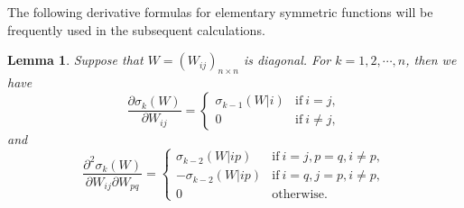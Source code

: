 \documentclass[11pt]{amsart}
\newtheorem{lemma}[theorem]{Lemma}
\numberwithin{theorem}{section}
\numberwithin{equation}{section}
\begin{document}
The following derivative formulas for elementary symmetric functions will be frequently used in the subsequent calculations.
\begin{lemma}\label{Lemma-sigma_k}
Suppose that $W=(W_{ij})_{n\times n}$ is diagonal. For $k=1,2,\cdots,n$, then we have $$\frac{\partial\sigma_k(W)}{\partial W_{ij}}=\begin{cases}
\sigma_{k-1}(W|i) & \mathrm{if}\ i=j,\\
0 & \mathrm{if}\ i\neq j,
\end{cases}$$ and $$\frac{\partial^2\sigma_k(W)}{\partial W_{ij}\partial W_{pq}}=\begin{cases}
\sigma_{k-2}(W|ip) & \mathrm{if}\ i=j, p=q, i\neq p,\\
-\sigma_{k-2}(W|ip) & \mathrm{if}\ i=q, j=p, i\neq p,\\
0 & \mathrm{otherwise}.
\end{cases}$$
\end{lemma}
\end{document}
